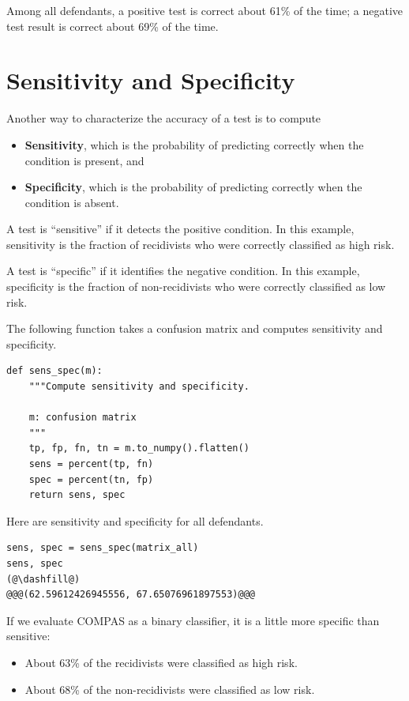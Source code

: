 Among all defendants, a positive test is correct about 61\% of the time;
a negative test result is correct about 69\% of the time.

\hypertarget{sensitivity-and-specificity}{%
\section{Sensitivity and
Specificity}\label{sensitivity-and-specificity}}

Another way to characterize the accuracy of a test is to compute

\begin{itemize}
\item
  \textbf{Sensitivity}, which is the probability of predicting correctly
  when the condition is present, and
\item
  \textbf{Specificity}, which is the probability of predicting correctly
  when the condition is absent.
\end{itemize}

A test is ``sensitive'' if it detects the positive condition. In this
example, sensitivity is the fraction of recidivists who were correctly
classified as high risk.

A test is ``specific'' if it identifies the negative condition. In this
example, specificity is the fraction of non-recidivists who were
correctly classified as low risk.

The following function takes a confusion matrix and computes sensitivity
and specificity.

\begin{lstlisting}[]
def sens_spec(m):
    """Compute sensitivity and specificity.
    
    m: confusion matrix
    """
    tp, fp, fn, tn = m.to_numpy().flatten()
    sens = percent(tp, fn)
    spec = percent(tn, fp)
    return sens, spec
\end{lstlisting}

Here are sensitivity and specificity for all defendants.

\begin{lstlisting}[]
sens, spec = sens_spec(matrix_all)
sens, spec
(@\dashfill@)
@@@(62.59612426945556, 67.65076961897553)@@@
\end{lstlisting}

If we evaluate COMPAS as a binary classifier, it is a little more
specific than sensitive:

\begin{itemize}
\item
  About 63\% of the recidivists were classified as high risk.
\item
  About 68\% of the non-recidivists were classified as low risk.
\end{itemize}

